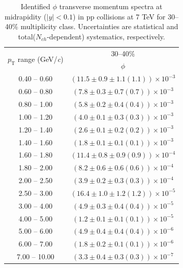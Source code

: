 \begin{table}
\caption{Identified $\phi$ transverse momentum spectra at midrapidity ($|y|<0.1$) in pp collisions at 7 TeV for 30--40\% multiplicity class. Uncertainties are statistical and total($N_{ch}$-dependent) systematics, respectively.}
\label{tab:Phi_30to40}
\begin{center}
\begin{tabular}{ c | c }
\hline
\multirow{2}{*}{$p_{\mathrm{T}}$ range (GeV/\textit{c})} & \multicolumn{1}{c}{30--40\%} \\ & $\phi$\\ 
\hline
0.40 -- 0.60 & $(11.5\pm0.9\pm1.1(1.1))\times10^{-3}$ \\ 
0.60 -- 0.80 & $(7.8\pm0.3\pm0.7(0.7))\times10^{-3}$ \\ 
0.80 -- 1.00 & $(5.8\pm0.2\pm0.4(0.4))\times10^{-3}$ \\ 
1.00 -- 1.20 & $(4.0\pm0.1\pm0.3(0.3))\times10^{-3}$ \\ 
1.20 -- 1.40 & $(2.6\pm0.1\pm0.2(0.2))\times10^{-3}$ \\ 
1.40 -- 1.60 & $(1.8\pm0.1\pm0.1(0.1))\times10^{-3}$ \\ 
1.60 -- 1.80 & $(11.4\pm0.8\pm0.9(0.9))\times10^{-4}$ \\ 
1.80 -- 2.00 & $(8.2\pm0.6\pm0.6(0.6))\times10^{-4}$ \\ 
2.00 -- 2.50 & $(3.9\pm0.2\pm0.3(0.3))\times10^{-4}$ \\ 
2.50 -- 3.00 & $(16.4\pm1.0\pm1.2(1.2))\times10^{-5}$ \\ 
3.00 -- 4.00 & $(4.9\pm0.3\pm0.4(0.4))\times10^{-5}$ \\ 
4.00 -- 5.00 & $(1.2\pm0.1\pm0.1(0.1))\times10^{-5}$ \\ 
5.00 -- 6.00 & $(4.9\pm0.4\pm0.4(0.4))\times10^{-6}$ \\ 
6.00 -- 7.00 & $(1.8\pm0.2\pm0.1(0.1))\times10^{-6}$ \\ 
7.00 -- 10.00 & $(3.3\pm0.4\pm0.3(0.3))\times10^{-7}$ \\ 
\hline
\end{tabular}
\end{center}
\end{table}
 
